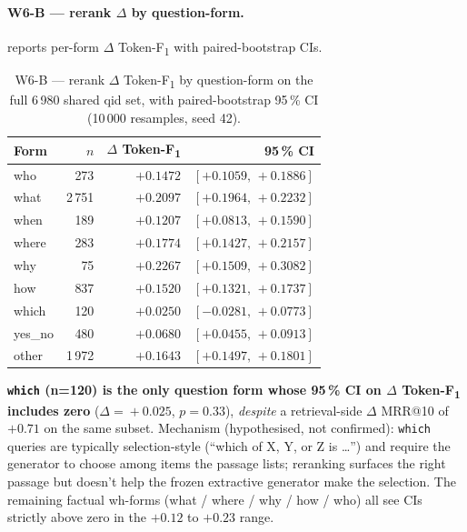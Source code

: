 \documentclass[11pt,a4paper]{article}
\makeatletter
\newcommand{\fdev}{6\,980}
\newcommand{\F}{F\textsubscript{1}}
\newcommand{\Tokenf}{Token-\F}
\newcommand{\mrr}{MRR@10}
\makeatother
\begin{document}
\paragraph{W6-B --- rerank $\Delta$ by question-form.}
 reports per-form $\Delta$ \Tokenf{} with
paired-bootstrap CIs.

\begin{table}[H]
  \centering
  \caption{W6-B --- rerank $\Delta$ \Tokenf{} by question-form on
  the full \fdev{} shared qid set, with paired-bootstrap 95\,\% CI
  (10\,000 resamples, seed 42).}
  \label{tab:w6b}
  \begin{tabular}{lrrr}
    \toprule
    Form    & $n$  & $\Delta$ \Tokenf{} & 95\,\% CI \\
    \midrule
    who     &  273 & $+0.1472$ & $[+0.1059,\,+0.1886]$ \\
    what    & 2\,751 & $+0.2097$ & $[+0.1964,\,+0.2232]$ \\
    when    &  189 & $+0.1207$ & $[+0.0813,\,+0.1590]$ \\
    where   &  283 & $+0.1774$ & $[+0.1427,\,+0.2157]$ \\
    why     &   75 & $+0.2267$ & $[+0.1509,\,+0.3082]$ \\
    how     &  837 & $+0.1520$ & $[+0.1321,\,+0.1737]$ \\
    which   &  120 & $+0.0250$ & $[-0.0281,\,+0.0773]$ \\
    yes\_no &  480 & $+0.0680$ & $[+0.0455,\,+0.0913]$ \\
    other   & 1\,972 & $+0.1643$ & $[+0.1497,\,+0.1801]$ \\
    \bottomrule
  \end{tabular}
\end{table}

\textbf{\texttt{which} (n=120) is the only question form whose
95\,\% CI on $\Delta$ \Tokenf{} includes zero} ($\Delta\!=\!+0.025$,
$p\!=\!0.33$), \emph{despite} a retrieval-side $\Delta$ \mrr{} of
$+0.71$ on the same subset.  Mechanism (hypothesised, not
confirmed): \texttt{which} queries are typically selection-style
(``which of X, Y, or Z is \ldots'') and require the generator to
choose among items the passage lists; reranking surfaces the right
passage but doesn't help the frozen extractive generator make the
selection.  The remaining factual wh-forms (what / where / why /
how / who) all see CIs strictly above zero in the $+0.12$ to
$+0.23$ range.
\end{document}
